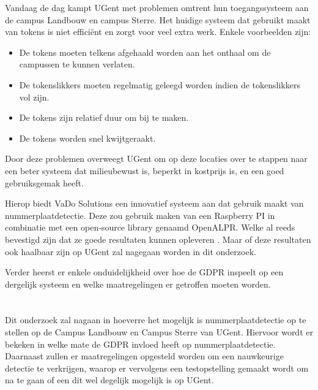 Vandaag de dag kampt UGent met problemen omtrent hun toegangssysteem aan de campus Landbouw en campus Sterre. Het huidige systeem dat gebruikt maakt van tokens is niet efficiënt en zorgt voor veel extra werk. Enkele voorbeelden zijn:
\begin{itemize}
	\item De tokens moeten telkens afgehaald worden aan het onthaal om de campussen te kunnen verlaten.
	\item De tokenslikkers moeten regelmatig geleegd worden indien de tokenslikkers vol zijn.
	\item De tokens zijn relatief duur om bij te maken.
	\item De tokens worden snel kwijtgeraakt.
\end{itemize}
Door deze problemen overweegt UGent om op deze locaties over te stappen naar een beter systeem dat milieubewust is, beperkt in kostprijs is, en een goed gebruiksgemak heeft. 

Hierop biedt VaDo Solutions een innovatief systeem aan dat gebruik maakt van nummerplaatdetectie. Deze zou gebruik maken van een Raspberry PI in combinatie met een open-source library genaamd OpenALPR. Welke al reeds bevestigd zijn dat ze goede resultaten kunnen opleveren \autocite{figuerola2016automated}. Maar of deze resultaten ook haalbaar zijn op UGent zal nagegaan worden in dit onderzoek.

Verder heerst er enkele onduidelijkheid over hoe de GDPR inspeelt op een dergelijk systeem en welke maatregelingen er getroffen moeten worden.

\section{}
\label{sec:onderzoeksvraag}

Dit onderzoek zal nagaan in hoeverre het mogelijk is nummerplaatdetectie op te stellen op de Campus Landbouw en Campus Sterre van UGent. Hiervoor wordt er bekeken in welke mate de GDPR invloed heeft op nummerplaatdetectie. Daarnaast zullen er maatregelingen opgesteld worden om een nauwkeurige detectie te verkrijgen, waarop er vervolgens een testopstelling gemaakt wordt om na te gaan of een dit wel degelijk mogelijk is op UGent.

